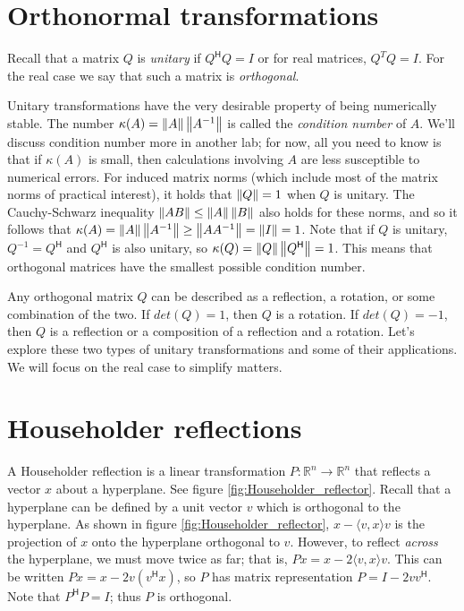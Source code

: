 \label{lab:Canonical Transformations}

\section*{Orthonormal transformations}
Recall that a matrix $Q$ is \emph{unitary} if $Q^\mathsf{H} Q = I$ or for real matrices,
$Q^T Q = I$.
For the real case we say that such a matrix is \emph{orthogonal}.

Unitary transformations have the very desirable property of being numerically stable.
The number $\kappa(A) = \left\lVert A\right\rVert \left\lVert A^{-1}\right\rVert$ is called the \emph{condition number} of $A$.
We'll discuss condition number more in another lab; for now, all you need to know is that if $\kappa(A)$ is small, then calculations involving $A$ are less susceptible to numerical errors.
For induced matrix norms (which include most of the matrix norms of practical interest), it holds that $\left\lVert Q\right\rVert=1$ when $Q$ is unitary.
The Cauchy-Schwarz inequality $\left\lVert AB\right\rVert \leq \left\lVert A\right\rVert \left\lVert B\right\rVert$ also holds for these norms, and
so it follows that $\kappa(A) = \left\lVert A\right\rVert \left\lVert A^{-1}\right\rVert \geq \left\lVert A A^{-1}\right\rVert = \left\lVert I\right\rVert = 1$.
Note that if $Q$ is unitary, $Q^{-1} = Q^\mathsf{H}$ and $Q^\mathsf{H}$ is also unitary, so $\kappa(Q) = \left\lVert Q\right\rVert \left\lVert Q^\mathsf{H}\right\rVert = 1$.
This means that orthogonal matrices have the smallest possible condition number.

Any orthogonal matrix $Q$ can be described as a reflection, a rotation, or some combination of the two.
If $det(Q) = 1$, then $Q$ is a rotation.
If $det(Q) = -1$, then $Q$  is a reflection or a composition of a reflection and a rotation.
Let's explore these two types of unitary transformations and some of their applications.
We will focus on the real case to simplify matters.

\section*{Householder reflections}
A Householder reflection is a linear transformation $P: \mathbb{R}^n \rightarrow \mathbb{R}^n$ that reflects a vector $x$ about a hyperplane.
See figure \ref{fig:Householder_reflector}.
Recall that a hyperplane can be defined by a unit vector $v$ which is orthogonal to the hyperplane.
As shown in figure \ref{fig:Householder_reflector}, $x - \langle v,x \rangle v$ is the projection of $x$ onto the hyperplane orthogonal to $v$.
However, to reflect \emph{across} the hyperplane, we must move twice as far; that is, $Px = x - 2\langle v,x \rangle v$.
This can be written $Px = x - 2v(v^\mathsf{H} x)$, so $P$ has matrix representation $P = I - 2v v^\mathsf{H}$.
Note that $P^\mathsf{H} P = I$; thus $P$ is orthogonal.

